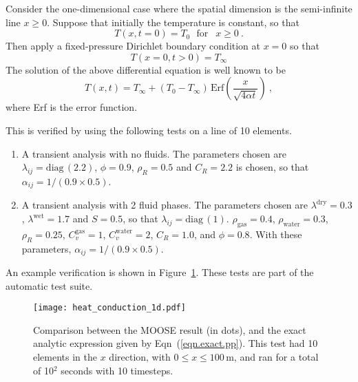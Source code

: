 \documentclass[]{scrreprt}
\def\diag{\mathrm{diag}\,}
\begin{document}
Consider the one-dimensional case where the spatial dimension is the
semi-infinite line $x\geq 0$.  Suppose that initially the temperature is
constant, so that
\begin{equation}
T(x, t=0) = T_{0} \ \ \ \mbox{for }\ \ x\geq 0 \ .
\end{equation}
Then apply a fixed-pressure Dirichlet boundary condition at $x=0$ so
that
\begin{equation}
T(x=0, t>0) = T_{\infty}
\end{equation}
The solution of the above differential equation is well known to be
\begin{equation}
T(x, t) = T_{\infty} + (T_{0} -
T_{\infty})\,\mbox{Erf}\left( \frac{x}{\sqrt{4\alpha t}} \right) \ ,
\label{eqn.exact.pp}
\end{equation}
where Erf is the error function.

This is verified by using the following tests on a line of 10 elements.
\begin{enumerate}
\item A transient analysis with no fluids.  The parameters chosen are $\lambda_{ij} =
  \diag(2.2)$, $\phi=0.9$, $\rho_{R}=0.5$ and $C_{R}=2.2$ is chosen,
  so that $\alpha_{ij} = 1/(0.9\times 0.5)$.
\item A transient analysis with 2 fluid phases.  The parameters chosen
  are $\lambda^{\mathrm{dry}}=0.3$, $\lambda^{\mathrm{wet}} = 1.7$ and
  $S=0.5$, so that $\lambda_{ij} = \diag(1)$.  $\rho_{\mathrm{gas}} =
  0.4$, $\rho_{\mathrm{water}} = 0.3$, $\rho_{R}=0.25$, $C_{v}^{\mathrm{gas}} = 1$,
  $C_{v}^{\mathrm{water}}=2$, $C_{R}=1.0$, and $\phi=0.8$.  With these
  parameters, $\alpha_{ij} = 1/(0.9\times 0.5)$.
\end{enumerate}
An example verification is shown in Figure~\ref{heat_conduction.fig}.
These tests are part of the automatic test suite.

\begin{figure}[htb]
\centering
\texttt{[image: heat\_conduction\_1d.pdf]}
\caption{Comparison between the MOOSE result (in dots), and the
  exact analytic expression given by Eqn~(\ref{eqn.exact.pp}).  This
  test had 10 elements in the $x$ direction, with $0\leq x \leq
  100$\,m, and ran for a total of
  10$^2$ seconds with 10 timesteps.}
\label{heat_conduction.fig}
\end{figure}
\end{document}
